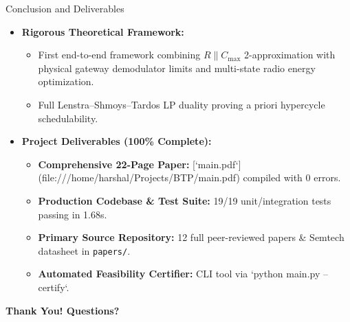 \documentclass[aspectratio=169,10pt]{beamer}
\begin{document}
\begin{frame}{Conclusion and Deliverables}
  \begin{itemize}
    \item \textbf{Rigorous Theoretical Framework:}
    \begin{itemize}
      \item First end-to-end framework combining $R \parallel C_{\max}$ 2-approximation with physical gateway demodulator limits and multi-state radio energy optimization.
      \item Full Lenstra--Shmoys--Tardos LP duality proving a priori hypercycle schedulability.
    \end{itemize}
    \item \textbf{Project Deliverables (100\% Complete):}
    \begin{itemize}
      \item \textbf{Comprehensive 22-Page Paper:} [`main.pdf`](file:///home/harshal/Projects/BTP/main.pdf) compiled with 0 errors.
      \item \textbf{Production Codebase \& Test Suite:} 19/19 unit/integration tests passing in 1.68s.
      \item \textbf{Primary Source Repository:} 12 full peer-reviewed papers \& Semtech datasheet in \texttt{papers/}.
      \item \textbf{Automated Feasibility Certifier:} CLI tool via `python main.py --certify`.
    \end{itemize}
  \end{itemize}
  \begin{center}
    \Large \textbf{Thank You! Questions?}
  \end{center}
\end{frame}
\end{document}
